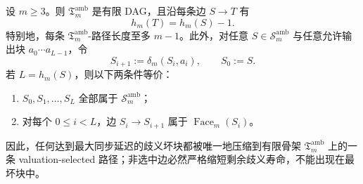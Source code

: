 \begin{theorem}\label{distill:khovanskii_newton_polyhedra_fewnomials_and_tropical_skeletons-support_to_skeleton_reduction-valuation-selected-ambiguity-synchronization-skeleton}
设 \(m\ge3\)。则 \(\mathfrak T_m^{\mathrm{amb}}\) 是有限 DAG，且沿每条边 \(S\to T\) 有
\[
 h_m(T)=h_m(S)-1.
\]
特别地，每条 \(\mathfrak T_m^{\mathrm{amb}}\)-路径长度至多 \(m-1\)。此外，对任意 \(S\in\mathcal S_m^{\mathrm{amb}}\) 与任意允许输出块 \(a_0\cdots a_{L-1}\)，令
\[
 S_{i+1}:=\delta_m(S_i,a_i),\qquad S_0:=S.
\]
若 \(L=h_m(S)\)，则以下两条件等价：
\begin{enumerate}
  \item \(S_0,S_1,\ldots,S_L\) 全部属于 \(\mathcal S_m^{\mathrm{amb}}\)；
  \item 对每个 \(0\le i<L\)，边 \(S_i\to S_{i+1}\) 属于 \(\operatorname{Face}_m(S_i)\)。
\end{enumerate}
因此，任何达到最大同步延迟的歧义坏块都被唯一地压缩到有限骨架 \(\mathfrak T_m^{\mathrm{amb}}\) 上的一条 valuation-selected 路径；非选中边必然严格缩短剩余歧义寿命，不能出现在最坏块中。
\end{theorem}
